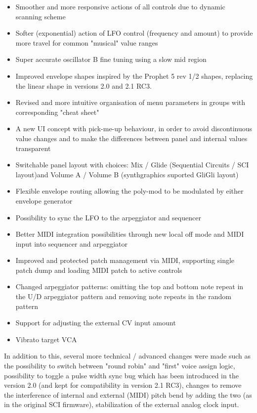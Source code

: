 \documentclass[landscape, 11pt, oneside]{report}
\newenvironment{flowtext}{\addmargin[0cm]{7cm}}{\endaddmargin} %
\begin{document}
\begin{flowtext}
\begin{itemize}
  \setlength\itemsep{0cm}
  \item Smoother and more responsive actions of all controls due to dynamic scanning scheme 
  \item Softer (exponential) action of LFO control (frequency and amount) to provide more travel for common "musical" value ranges
  \item Super accurate oscillator B fine tuning using a slow mid region
  \item Improved envelope shapes inspired by the Prophet 5 rev 1/2 shapes, replacing the linear shape in versions 2.0 and 2.1 RC3.  
  \item Revised and more intuitive organisation of menu parameters in groups with corresponding "cheat sheet"
  \item A new UI concept with pick-me-up behaviour, in order to avoid discontinuous value changes and to make the differences between panel and internal values transparent 
  \item Switchable panel layout with choices: Mix / Glide (Sequential Circuits / SCI layout)and Volume A / Volume B (synthgraphics suported GliGli layout) 
  \item Flexible envelope routing allowing the poly-mod to be modulated by either envelope generator
  \item Possibility to sync the LFO to the arpeggiator and sequencer
  \item Better MIDI integration possibilities through new local off mode and MIDI input into sequencer and arpeggiator
  \item Improved and protected patch management via MIDI, supporting single patch dump and loading MIDI patch to active controls 
  \item Changed arpeggiator patterns: omitting the top and bottom note repeat in the U/D arpeggiator pattern and removing note repeats in the random pattern
  \item Support for adjusting the external CV input amount
  \item Vibrato target VCA
\end{itemize}

In addition to this, several more technical / advanced changes were made such as the possibility to switch between "round robin" and "first" voice assign logic, possibility to toggle a pulse width sync bug which has been introduced in the version 2.0 (and kept for compatibility in version 2.1 RC3), changes to remove the interference  of internal and external (MIDI) pitch bend by adding the two (as in the original SCI firmware), stabilization of the external analog clock input.


\end{flowtext}
\end{document}

